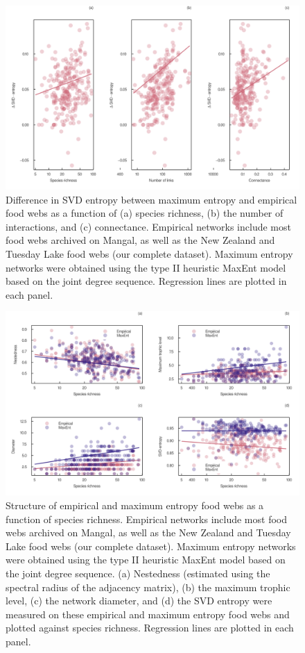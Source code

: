 \documentclass[
  12pt,
]{article}
\begin{document}
\begin{figure}
\hypertarget{fig:entropy_size}{%
\centering
\includegraphics{figures/difference_entropy.png}
\caption{Difference in SVD entropy between maximum entropy and empirical
food webs as a function of (a) species richness, (b) the number of
interactions, and (c) connectance. Empirical networks include most food
webs archived on Mangal, as well as the New Zealand and Tuesday Lake
food webs (our complete dataset). Maximum entropy networks were obtained
using the type II heuristic MaxEnt model based on the joint degree
sequence. Regression lines are plotted in each
panel.}\label{fig:entropy_size}
}
\end{figure}

\begin{figure}
\hypertarget{fig:measures_richness}{%
\centering
\includegraphics{figures/measures_richness.png}
\caption{Structure of empirical and maximum entropy food webs as a
function of species richness. Empirical networks include most food webs
archived on Mangal, as well as the New Zealand and Tuesday Lake food
webs (our complete dataset). Maximum entropy networks were obtained
using the type II heuristic MaxEnt model based on the joint degree
sequence. (a) Nestedness (estimated using the spectral radius of the
adjacency matrix), (b) the maximum trophic level, (c) the network
diameter, and (d) the SVD entropy were measured on these empirical and
maximum entropy food webs and plotted against species richness.
Regression lines are plotted in each
panel.}\label{fig:measures_richness}
}
\end{figure}
\end{document}
